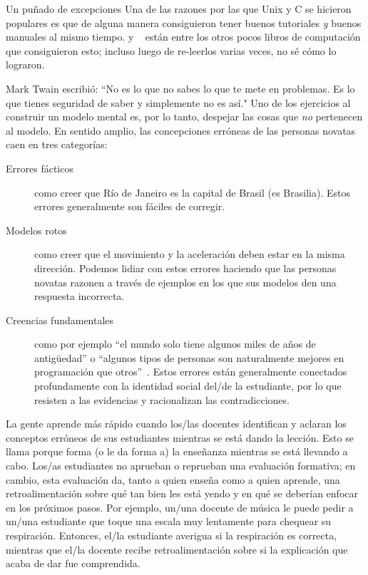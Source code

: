 \begin{aside}{Un puñado de excepciones}
  Una de las razones por las que Unix y C se hicieron populares es que 
  \cite{Kern1978,Kern1983,Kern1988}
  de alguna manera consiguieron tener buenos tutoriales \emph{y} buenos manuales al mismo tiempo.
  \cite{Fehi2008} y ~\cite{Ray2014} están entre los otros pocos libros de computación que consiguieron esto; incluso luego de re-leerlos varias veces, no sé cómo lo lograron.
\end{aside}


Mark Twain escribió: 
``No es lo que no sabes lo que te mete en problemas.
Es lo que tienes seguridad de saber y simplemente no es así."
Uno de los ejercicios al construir un modelo mental es, por lo tanto,
despejar las cosas que \emph{no} pertenecen al modelo.
En sentido amplio,
las concepciones erróneas de las personas novatas caen en tres categorías:

\begin{description}

\item[Errores fácticos]
  como creer que Río de Janeiro es la capital de Brasil (es Brasilia).
Estos errores generalmente son fáciles de corregir.

\item[Modelos rotos]
  como creer que el movimiento y la aceleración deben estar en la misma dirección.
Podemos lidiar con estos errores haciendo que las personas novatas razonen a través de ejemplos
en los que sus modelos den una respuesta incorrecta.

\item[Creencias fundamentales]
  como por ejemplo ``el mundo solo tiene algunos miles de años de antigüedad''
  o ``algunos tipos de personas son naturalmente mejores en programación que otros''~\cite{Guzd2015b,Pati2016}.
  Estos errores están generalmente conectados profundamente con la identidad social del/de la estudiante, 
por lo que resisten a las evidencias y racionalizan las contradicciones.

\end{description}

La gente aprende más rápido cuando los/las docentes identifican y aclaran los conceptos erróneos de sus estudiantes mientras se está dando la lección.
Esto se llama 
porque forma (o le da forma a) la enseñanza mientras se está llevando a cabo.
Los/as estudiantes no aprueban o reprueban una evaluación formativa;
en cambio,
esta evaluación da, tanto a quien enseña como a quien aprende, una retroalimentación sobre qué tan bien les está yendo y en qué se deberían enfocar en los próximos pasos.
Por ejemplo,
un/una docente de música le puede pedir a un/una estudiante que toque una escala muy lentamente para chequear su respiración.
Entonces, el/la estudiante averigua si la respiración es correcta, mientras que el/la docente recibe retroalimentación sobre si la explicación que acaba de dar fue comprendida.


